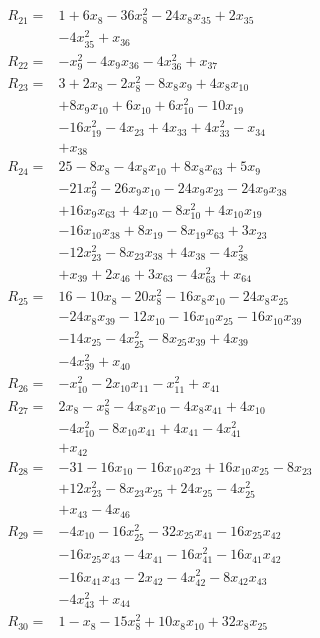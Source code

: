 \begin{align*}
R_{21}={}&1 +6x_{8} -36x_{8}^{2} -24x_{8}x_{35} +2x_{35}\\
&-4x_{35}^{2} +x_{36}\\[3pt]
R_{22}={}&-x_{9}^{2} -4x_{9}x_{36} -4x_{36}^{2} +x_{37}\\[3pt]
R_{23}={}&3 +2x_{8} -2x_{8}^{2} -8x_{8}x_{9} +4x_{8}x_{10}\\
&+8x_{9}x_{10} +6x_{10} +6x_{10}^{2} -10x_{19}\\
&-16x_{19}^{2} -4x_{23} +4x_{33} +4x_{33}^{2} -x_{34}\\
&+x_{38}\\[3pt]
R_{24}={}&25 -8x_{8} -4x_{8}x_{10} +8x_{8}x_{63} +5x_{9}\\
&-21x_{9}^{2} -26x_{9}x_{10} -24x_{9}x_{23} -24x_{9}x_{38}\\
&+16x_{9}x_{63} +4x_{10} -8x_{10}^{2} +4x_{10}x_{19}\\
&-16x_{10}x_{38} +8x_{19} -8x_{19}x_{63} +3x_{23}\\
&-12x_{23}^{2} -8x_{23}x_{38} +4x_{38} -4x_{38}^{2}\\
&+x_{39} +2x_{46} +3x_{63} -4x_{63}^{2} +x_{64}\\[3pt]
R_{25}={}&16 -10x_{8} -20x_{8}^{2} -16x_{8}x_{10} -24x_{8}x_{25}\\
&-24x_{8}x_{39} -12x_{10} -16x_{10}x_{25} -16x_{10}x_{39}\\
&-14x_{25} -4x_{25}^{2} -8x_{25}x_{39} +4x_{39}\\
&-4x_{39}^{2} +x_{40}\\[3pt]
R_{26}={}&-x_{10}^{2} -2x_{10}x_{11} -x_{11}^{2} +x_{41}\\[3pt]
R_{27}={}&2x_{8} -x_{8}^{2} -4x_{8}x_{10} -4x_{8}x_{41} +4x_{10}\\
&-4x_{10}^{2} -8x_{10}x_{41} +4x_{41} -4x_{41}^{2}\\
&+x_{42}\\[3pt]
R_{28}={}&-31 -16x_{10} -16x_{10}x_{23} +16x_{10}x_{25} -8x_{23}\\
&+12x_{23}^{2} -8x_{23}x_{25} +24x_{25} -4x_{25}^{2}\\
&+x_{43} -4x_{46}\\[3pt]
R_{29}={}&-4x_{10} -16x_{25}^{2} -32x_{25}x_{41} -16x_{25}x_{42}\\
&-16x_{25}x_{43} -4x_{41} -16x_{41}^{2} -16x_{41}x_{42}\\
&-16x_{41}x_{43} -2x_{42} -4x_{42}^{2} -8x_{42}x_{43}\\
&-4x_{43}^{2} +x_{44}\\[3pt]
R_{30}={}&1 -x_{8} -15x_{8}^{2} +10x_{8}x_{10} +32x_{8}x_{25}\\

\end{align*}
